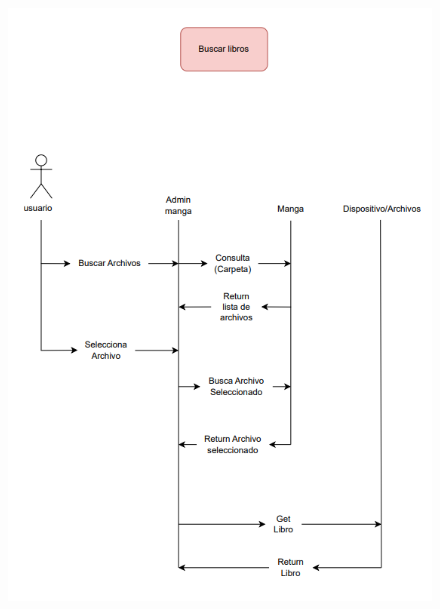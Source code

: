 \documentclass[12pt]{article}
\begin{document}
\begin{figure}[htbp]
	\centering
		\includegraphics[width=1.00\textwidth]{Screenshot 2023-10-05 114437.png}
	\label{fig:Screenshot 2023-10-05 114437}
\end{figure}
\end{document}
